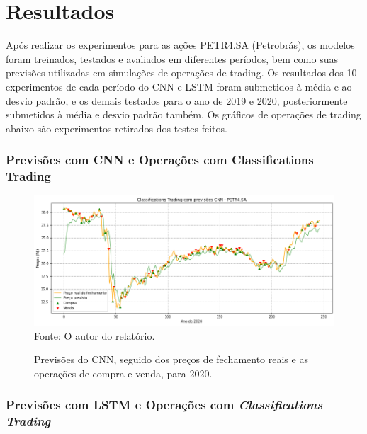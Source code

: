 \chapter{Resultados}

\par
Após realizar os experimentos para as ações PETR4.SA (Petrobrás), os modelos foram treinados, testados e avaliados em diferentes períodos, bem como suas previsões utilizadas em simulações de operações de trading. Os resultados dos 10 experimentos de cada período do CNN e LSTM foram submetidos à média e ao desvio padrão, e os demais testados para o ano de 2019 e 2020, posteriormente submetidos à média e desvio padrão também. Os gráficos de operações de trading abaixo são experimentos retirados dos testes feitos.



\subsection{\textbf{Previsões com CNN e Operações com Classifications Trading}}


\begin{figure}[hbt]
\centering
\caption{\label{figure:figura1}Previsões do CNN, seguido dos preços de fechamento reais e as operações de compra e venda, para 2020.}
  \includegraphics[scale=0.5]{figures/img18.png}
  Fonte: O autor do relatório.
\end{figure}



\subsection{\textbf{Previsões com LSTM e Operações com \textit{Classifications Trading}}}


